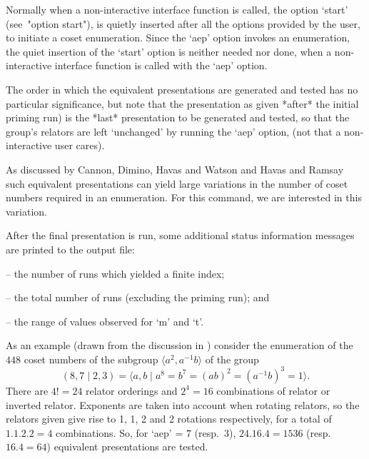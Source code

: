 Normally when a non-interactive {\ACE} interface function  is  called,
the option `start' (see~"option start"), is quietly inserted after all
the options provided by the user, to  initiate  a  coset  enumeration.
Since the `aep' option invokes an enumeration, the quiet insertion  of
the `start' option is neither needed nor done, when a  non-interactive
{\ACE} interface function is called with the `aep' option.

The order in which the  equivalent  presentations  are  generated  and
tested has no particular significance, but note that the  presentation
as given *after* the initial priming run) is the  *last*  presentation
to be generated and tested, so that  the  group's  relators  are  left
`unchanged' by running the `aep' option, (not that  a  non-interactive
user cares).

As discussed by Cannon, Dimino, Havas  and  Watson  \cite{CDHW73}  and
Havas and Ramsay \cite{HR01} such equivalent presentations  can  yield
large variations in  the  number  of  coset  numbers  required  in  an
enumeration. For this command, we are interested in this variation.

After  the  final  presentation  is  run,   some   additional   status
information messages are printed to the {\ACE} output file:

\beginlist%

\item{--}  the number of runs which yielded a finite index; 

\item{--}  the total number of runs (excluding the priming run); and 

\item{--}  the range of values observed for `m' and `t'.

\endlist

As an example (drawn from the discussion in \cite{HR99a}) consider the
enumeration   of   the   $448$   coset   numbers   of   the   subgroup
$\langle  a^2,a^{-1}b \rangle$ of the group
$$
(8,7 \mid 2,3) 
    = \langle a,b \mid a^8 = b^7 = (ab)^2 = (a^{-1}b)^3 = 1 \rangle.
$$
There are $4!=24$  relator  orderings  and  $2^4=16$  combinations  of
relator or inverted relator. Exponents are  taken  into  account  when
rotating relators, so the relators given give rise to 1, 1,  2  and  2
rotations respectively, for a total of $1.1.2.2=4$  combinations.  So,
for  `aep'  =  $7$   (resp.~$3$),   $24.16.4=1536$   (resp.~$16.4=64$)
equivalent presentations are tested.

